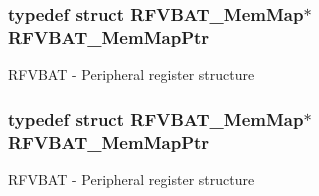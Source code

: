 \subsubsection[{\texorpdfstring{R\+F\+V\+B\+A\+T\+\_\+\+Mem\+Map\+Ptr}{RFVBAT_MemMapPtr}}]{\setlength{\rightskip}{0pt plus 5cm}typedef struct {\bf R\+F\+V\+B\+A\+T\+\_\+\+Mem\+Map}$\ast$ {\bf R\+F\+V\+B\+A\+T\+\_\+\+Mem\+Map\+Ptr}}\hypertarget{group___r_f_v_b_a_t___peripheral_gaf818ad4cab94790b0374758504777f4f}{}\label{group___r_f_v_b_a_t___peripheral_gaf818ad4cab94790b0374758504777f4f}
R\+F\+V\+B\+AT -\/ Peripheral register structure 
\subsubsection[{\texorpdfstring{R\+F\+V\+B\+A\+T\+\_\+\+Mem\+Map\+Ptr}{RFVBAT_MemMapPtr}}]{\setlength{\rightskip}{0pt plus 5cm}typedef struct {\bf R\+F\+V\+B\+A\+T\+\_\+\+Mem\+Map}$\ast$ {\bf R\+F\+V\+B\+A\+T\+\_\+\+Mem\+Map\+Ptr}}\hypertarget{group___r_f_v_b_a_t___peripheral_gaf818ad4cab94790b0374758504777f4f}{}\label{group___r_f_v_b_a_t___peripheral_gaf818ad4cab94790b0374758504777f4f}
R\+F\+V\+B\+AT -\/ Peripheral register structure 